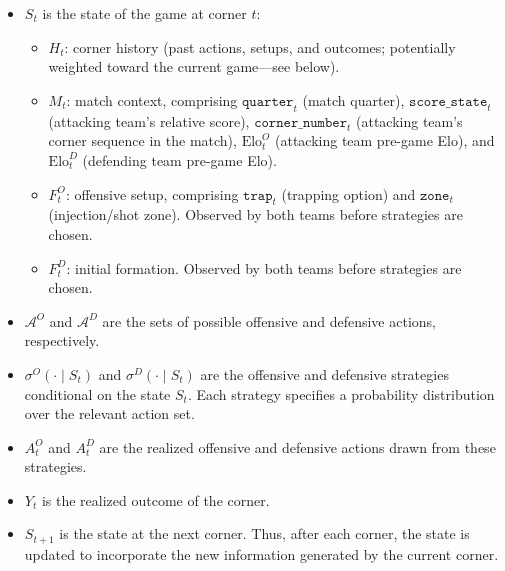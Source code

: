 \documentclass[11pt,english]{article}
\begin{document}
\begin{itemize}
    \item $S_t$ is the state of the game at corner $t$:
    \begin{itemize}
        \item $H_t$: corner history (past actions, setups, and outcomes; potentially weighted toward the current game---see below).
        \item $M_t$: match context, comprising $\texttt{quarter}_t$ (match quarter), $\texttt{score\_state}_t$ (attacking team's relative score), $\texttt{corner\_number}_t$ (attacking team's corner sequence in the match), $\text{Elo}^O_t$ (attacking team pre-game Elo), and $\text{Elo}^D_t$ (defending team pre-game Elo).
        \item $F^{O}_t$: offensive setup, comprising $\texttt{trap}_t$ (trapping option) and $\texttt{zone}_t$ (injection/shot zone). Observed by both teams before strategies are chosen.
        \item $F^{D}_t$: initial formation. Observed by both teams before strategies are chosen.
    \end{itemize}

    \item $\mathcal{A}^O$ and $\mathcal{A}^D$ are the sets of possible offensive and defensive actions, respectively.

    \item $\sigma^O(\cdot \mid S_t)$ and $\sigma^D(\cdot \mid S_t)$ are the offensive and defensive strategies conditional on the state $S_t$. Each strategy specifies a probability distribution over the relevant action set.

    \item $A_t^O$ and $A_t^D$ are the realized offensive and defensive actions drawn from these strategies.

    \item $Y_t$ is the realized outcome of the corner.

    \item $S_{t+1}$ is the state at the next corner. Thus, after each corner, the state is updated to incorporate the new information generated by the current corner.
\end{itemize}
\end{document}

